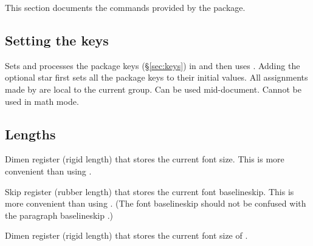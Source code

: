 \documentclass{beerydoc}
\begin{document}
This section documents the commands provided by the  package.

\subsection{Setting the keys}
\label{subsec:setup}

\begin{function}{\fontscalesetup}
  \begin{syntax}
     \sarg{} 
  \end{syntax}
  Sets and processes the  package keys (\S\ref{sec:keys}) in
   and then uses .
  Adding the optional star first sets all the  package keys to
  their initial values.
  All assignments made by  are local to the current group.
  Can be used mid-document.
  Cannot be used in math mode.
\end{function}

\subsection{Lengths}
\label{subsec:lengths}

\begin{variable}{\currentfontsize}
  \begin{syntax}
  \end{syntax}
  Dimen register (rigid length) that stores the current font size.
  This is more convenient than using .
\end{variable}

\begin{variable}{\currentfontbaselineskip}
  \begin{syntax}
  \end{syntax}
  Skip register (rubber length) that stores the current font baselineskip.
  This is more convenient than using .
  (The font baselineskip should not be confused with the paragraph
  baselineskip .)
\end{variable}

\begin{variable}{\currentnormalsize}
  \begin{syntax}
  \end{syntax}
  Dimen register (rigid length) that stores the current font size of
  .
\end{variable}
\end{document}
